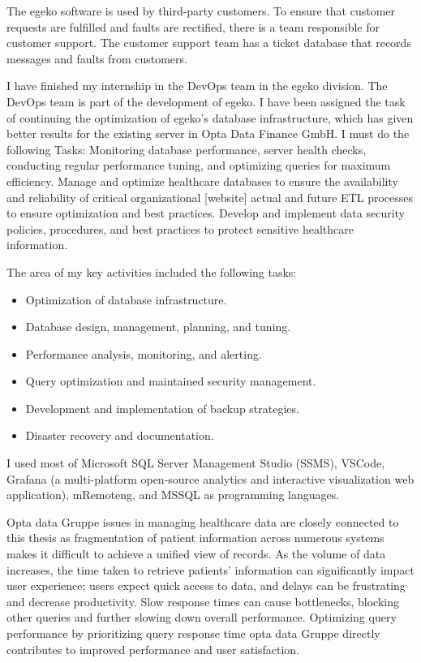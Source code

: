 The egeko software is used by third-party customers. To ensure that customer requests are fulfilled and faults are rectified, there is a team responsible for customer support. The customer support team has a ticket database that records messages and faults from customers.\vspace{.4cm}

I have finished my internship in the DevOps team in the egeko division. The DevOps team is part of the development of egeko. I have been assigned the task of continuing the optimization of egeko's database infrastructure, which has given better results for the existing server in Opta Data Finance GmbH. I must do the following Tasks: Monitoring database performance, server health checks, conducting regular performance tuning, and optimizing queries for maximum efficiency. Manage and optimize healthcare databases to ensure the availability and reliability of critical organizational [website] actual and future ETL processes to ensure optimization and best practices. Develop and implement data security policies, procedures, and best practices to protect sensitive healthcare information.\vspace{.4cm}

The area of my key activities included the following tasks:
\begin{itemize}
    \item Optimization of database infrastructure.
    \item Database design, management, planning, and tuning.
    \item Performance analysis, monitoring, and alerting.
    \item Query optimization and maintained security management.
    \item Development and implementation of backup strategies.
    \item Disaster recovery and documentation.
\end{itemize}

I used most of Microsoft SQL Server Management Studio (SSMS), VSCode, Grafana (a multi-platform open-source analytics and interactive visualization web application), mRemoteng, and MSSQL as programming languages.

Opta data Gruppe issues in managing healthcare data are closely connected to this thesis as fragmentation of patient information across numerous systems makes it difficult to achieve a unified view of records. As the volume of data increases, the time taken to retrieve patients' information can significantly impact user experience; users expect quick access to data, and delays can be frustrating and decrease productivity. Slow response times can cause bottlenecks, blocking other queries and further slowing down overall performance. Optimizing query performance by prioritizing query response time opta data Gruppe directly contributes to improved performance and user satisfaction.

